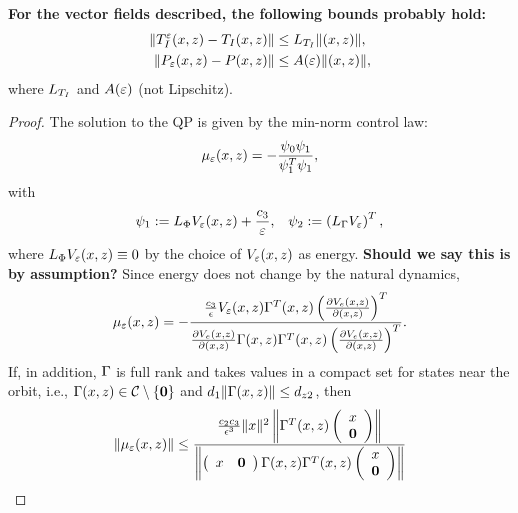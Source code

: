 \documentclass[twocolumn]{article}
\begin{document}
\begin{lemma}
  \label{lemma:hard-one}
  {\bf For the vector fields described, the following bounds probably hold:}
  \begin{align}
    \nonumber
    \| T_{I}^{\varepsilon}(x, z) - T_{I}(x, z) \| &\leq L_{T_{I}} \|(x, z)\|,\\
    \nonumber
    \| P_{\varepsilon}(x, z) - P(x, z) \| &\leq A(\varepsilon) \|(x, z)\|,
  \end{align}
  where $L_{T_{I}}$ and $A(\varepsilon)$ (not Lipschitz).
\end{lemma}
\begin{proof}
  The solution to the QP is given by the min-norm control law:
  \begin{align}
    \mu_{\varepsilon}(x, z) = -\frac{\psi_{0}\psi_{1}}{\psi_{1}^{T}\psi_{1}},
  \end{align}
  with
  \begin{align}
    \psi_{1} := L_{\Phi} V_{\varepsilon}(x, z) + \frac{c_{3}}{\varepsilon}, &&
    \psi_{2} := \left( L_{\Gamma} V_{\varepsilon} \right)^{T},
  \end{align}
  where $L_{\Phi} V_{\varepsilon}(x, z) \equiv 0$ by the choice of $V_{\varepsilon}(x, z)$ as energy.
  {\bf Should we say this is by assumption?}
  Since energy does not change by the natural dynamics,
  \begin{align}
    \mu_{\varepsilon}(x, z) = - \frac{\frac{c_{3}}{\epsilon} V_{\varepsilon}(x, z) \Gamma^{T}(x, z) \left( \frac{\partial{V_{e}(x, z)}}{\partial{(x, z)}} \right)^{T}}{\frac{\partial{V_{e}(x, z)}}{\partial{(x, z)}} \Gamma(x, z) \Gamma^{T}(x, z) \left( \frac{\partial{V_{e}(x, z)}}{\partial{(x, z)}} \right)^{T}}.
  \end{align}
  If, in addition, $\Gamma$ is full rank and takes values in a compact set for states near the orbit, i.e., $\Gamma(x, z) \in \mathcal{C} \setminus \{{\mathbf 0}\}$ and $d_{1} \| \Gamma(x, z) \| \leq d_{z2}$, then
  \begin{align}
    \nonumber
    \| \mueps\argsxz \|
    &\leq \frac{\frac{c_{2}c_{3}}{\epsilon^3} \nzdx^{2} \left\| \bigG^{T}\argsxz
      \left(\begin{array}{c}
        \zdx\\
        \boldzero
      \end{array}\right)\right\|}{\left\|
      \left(\begin{array}{c c}
        \zdx & \boldzero
      \end{array}\right) \bigG\argsxz \bigG^{T}\argsxz
      \left(\begin{array}{c}
        \zdx\\
        \boldzero
      \end{array}\right) \right\|}\\

\end{align}
\end{proof}
\end{document}
